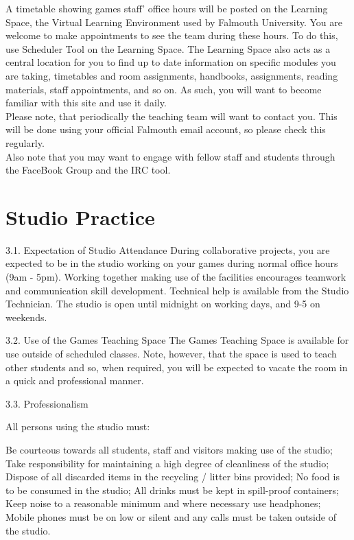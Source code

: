A timetable showing games staff’ office hours will be posted on the Learning Space, the Virtual Learning Environment used by Falmouth University. You are welcome to make appointments to see the team during these hours. To do this, use Scheduler Tool on the Learning Space. The Learning Space also acts as a central location for you to find up to date information on specific modules you are taking, timetables and room assignments, handbooks, assignments, reading materials, staff appointments, and so on. As such, you will want to become familiar with this site and use it daily.\\

Please note, that periodically the teaching team will want to contact you. This will be done using your official Falmouth email account, so please check this regularly. \\

Also note that you may want to engage with fellow staff and students through the FaceBook Group and the IRC tool.\\

\chapter{Studio Practice}
\newpage

3.1.	Expectation of Studio Attendance
During collaborative projects, you are expected to be in the studio working on your games during normal office hours (9am - 5pm). Working together making use of the facilities encourages teamwork and communication skill development. Technical help is available from the Studio Technician.  The studio is open until midnight on working days, and 9-5 on weekends.

3.2.	Use of the Games Teaching Space
The Games Teaching Space is available for use outside of scheduled classes. Note, however, that the space is used to teach other students and so, when required, you will be expected to vacate the room in a quick and professional manner.

3.3.	Professionalism

All persons using the studio must:

Be courteous towards all students, staff and visitors making use of the studio;
Take responsibility for maintaining a high degree of cleanliness of the studio;
Dispose of all discarded items in the recycling / litter bins provided;
No food is to be consumed in the studio;
All drinks must be kept in spill-proof containers;
Keep noise to a reasonable minimum and where necessary use headphones;
Mobile phones must be on low or silent and any calls must be taken outside of the studio.

